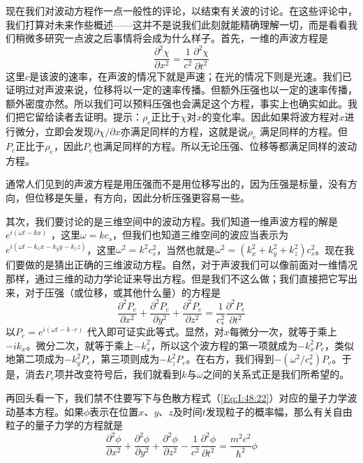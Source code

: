 现在我们对波动方程作一点一般性的评论，以结束有关波的讨论。在这些评论中，我们打算对未来作些概述——这并不是说我们此刻就能精确理解一切，而是看看我们稍微多研究一点波之后事情将会成为什么样子。首先，一维的声波方程是
\begin{equation*}
    \frac{\partial^2\chi}{\partial x^2} = \frac{1}{c^2} \frac{\partial^2 \chi}{\partial t^2}
\end{equation*}
这里$c$是该波的速率，在声波的情况下就是声速；在光的情况下则是光速。我们已证明过对声波来说，位移将以一定的速率传播。但额外压强也以一定的速率传播，额外密度亦然。所以我们可以预料压强也会满足这个方程，事实上也确实如此。我们把它留给读者去证明。提示：$\rho_e$正比于$\chi$对$x$的变化率。因此如果将波方程对$x$进行微分，立即会发现$\partial \chi /\partial x$亦满足同样的方程，这就是说$\rho_e$ 满足同样的方程。但$P_e$正比于$\rho_e$，因此$P_e$也满足同样的方程。所以无论压强、位移等都满足同样的波动方程。

通常人们见到的声波方程是用压强而不是用位移写出的，因为压强是标量，没有方向，但位移是矢量，有方向，因此分析压强更容易一些。

其次，我们要讨论的是三维空间中的波动方程。我们知道一维声波方程的解是$e^{i(\omega t - kx )}$ ，这里$\omega =kc_s$，但我们也知道三维空间的波应当表示为$e^{i(\omega t - k_x x - k_y y - k_z z)}$，这里$\omega^2 = k^2c_s^2$，当然也就是$\omega^2 = (k_x^2 + k_y^2 + k_z^2)c_s^2$。现在我们要做的是猜出正确的三维波动方程。自然，对于声波我们可以像前面对一维情况那样，通过三维的动力学论证来导出方程。但是我们不这么做；我们直接把它写出来，对于压强（或位移，或其他什么量）的方程是
\begin{equation}
    \label{Eq:I:48:23}
    \frac{\partial^2 P_e}{\partial x^2} + \frac{\partial^2 P_e}{\partial y^2} + \frac{\partial^2 P_e}{\partial z^2} = \frac{1}{c_s^2}\frac{\partial^2 P_e}{\partial t^2}
\end{equation}
以$P_e =e^{i(\omega t - k\cdot r)}$ 代入即可证实此等式。显然，对$x$每微分一次，就等于乘上$-ik_x$。微分二次，就等于乘上$-k_x^2$，所以这个波方程的第一项就成为$-k_x^2P_e$，类似地第二项成为$-k_y^2P_e$，第三项则成为$-k_z^2P_e$。在右方，我们得到$-(\omega^2/c_s^2)P_e$。于是，消去$P_e$项并改变符号后，我们就看到$k$与$\omega$之间的关系式正是我们所希望的。

再回头看一下，我们禁不住要写下与色散方程式（\ref{Eq:I:48:22}）对应的量子力学波动基本方程。如果$\phi$表示在位置$x$、$y$、$z$及时间$t$发现粒子的概率幅，那么有关自由粒子的量子力学的方程就是
\begin{equation}
    \label{Eq:I:48:24}
    \frac{\partial^2 \phi}{\partial x^2} + \frac{\partial^2 \phi}{\partial y^2} + \frac{\partial^2 \phi}{\partial z^2} - \frac{1}{c^2}\frac{\partial^2 \phi}{\partial t^2} = \frac{m^2c^2}{\hbar^2}\phi
\end{equation}

